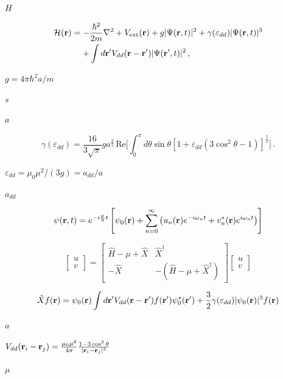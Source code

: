 \documentclass{article}
\begin{document}
$ H $
\pagebreak

\[
 \begin{align}
  \mathcal{H}({\bf r})=-&\frac{\hbar^2}{2m}\nabla^2+V_{\rm ext}({\bf r})+g|\Psi({\bf r},t)|^2+\gamma
  (\varepsilon_{dd})|\Psi({\bf r},t)|^3\nonumber\\
  +& \int d{\bf r'}V_{dd}({\bf r}-{\bf r'})|\Psi({\bf r'},t)|^2\,,
 \end{align}
\]
\pagebreak

$ g=4\pi\hbar^2a/m $
\pagebreak

$ s $
\pagebreak

$ a $
\pagebreak

\[
 \gamma(\varepsilon_{dd})=\frac{16}{3\sqrt{\pi}} ga^{\frac{3}{2}}\,\mbox{Re}\bigg[\!\int_0^{\pi}
 \!\!\!\!d\theta\sin\theta [1+\varepsilon_{dd}(3\cos^2\theta-1)]^{\frac{5}{2}}\bigg]\,.
\]
\pagebreak

$ \varepsilon_{dd}=\mu_0\mu^2/(3g)=a_{dd}/a $
\pagebreak

$ a_{dd} $
\pagebreak

\[
  \psi({\bf r},t) = e^{-i\frac{\mu}{\hbar}t}\left[ \psi_0({\bf r})
 + \sum_{n=0}^{\infty} \left( u_n({\bf r})e^{-i\omega_n t} + v^*_n({\bf r})e^{i\omega_n t} \right) \right]
\]
\pagebreak

\[

 \begin{bmatrix}
     u \\
     v
 \end{bmatrix}
     =
 \begin{bmatrix}
     \hat{H}-\mu+\hat{X} & \hat{X}^\dagger \\
     -\hat{X} & -(\hat{H}-\mu+\hat{X}^\dagger)
 \end{bmatrix}
 \begin{bmatrix}
     u \\
     v
 \end{bmatrix}

\]
\pagebreak

\[

\hat{X}f({\bf r}) = \psi_0({\bf r})\int d{\bf r}' V_{dd}({\bf r}-{\bf r}')f({\bf r}')\psi_0^*({\bf r}') +
\frac{3}{2}\gamma(\varepsilon_{dd})|\psi_0({\bf r})|^3f({\bf r})

\]
\pagebreak

$ a
$
\pagebreak

$ V_{dd}({\bf r}_{i}-{\bf r}_{j})=\frac{\mu_0\mu^2}{4\pi}\frac{1-3\cos^2\theta}{|{\bf r}_{i}-{\bf
r}_{j}|^3} $
\pagebreak

$
\mu $
\pagebreak
\end{document}
